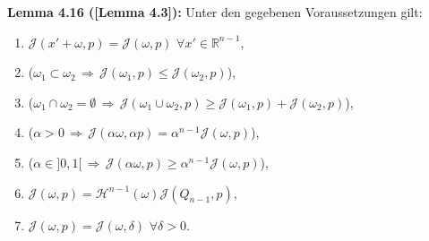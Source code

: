 \colorbox{generalYellow}{\begin{minipage}{16cm}{\textcolor{black}{}{\label{lem4.16}}}
\textbf{Lemma 4.16 (\cite{ContiTwoGradientPhase}[Lemma 4.3]):} Unter den gegebenen Voraussetzungen gilt:
\begin{enumerate}
    \item \(\mathcal{J}(x' + \omega,p) = \mathcal{J}(\omega,p) \, \, \forall x' \in \mathbb{R}^{n-1}\),
    \item (\(\omega_1 \subset \omega_2 \, \Rightarrow \, \mathcal{J}(\omega_1,p) \leq \mathcal{J}(\omega_2,p)\)),
    \item (\(\omega_1 \cap \omega_2 = \emptyset \, \Rightarrow \, \mathcal{J}(\omega_1 \cup \omega_2,p) \geq \mathcal{J}(\omega_1,p) + \mathcal{J}(\omega_2,p)\)),
    \item (\(\alpha > 0 \, \Rightarrow \, \mathcal{J}(\alpha \omega,\alpha p) = \alpha^{n-1} \mathcal{J}(\omega,p)\)),
    \item (\(\alpha \in ]0,1[ \, \Rightarrow \, \mathcal{J}(\alpha \omega,p) \geq \alpha^{n-1} \mathcal{J}(\omega,p)\)),
    \item \(\mathcal{J}(\omega,p) = \mathcal{H}^{n-1}(\omega) \mathcal{J}(Q_{n-1},p)\),
    \item \(\mathcal{J}(\omega,p) = \mathcal{J}(\omega,\delta) \, \, \forall \delta > 0\).
\end{enumerate}
\end{minipage}} 

